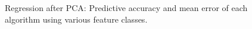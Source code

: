 \begin{figure}[p]
\centering
{}
\caption{Regression after PCA: Predictive accuracy and mean error of each algorithm using various feature classes.}
\label{linear_plus_pca}
\end{figure}
